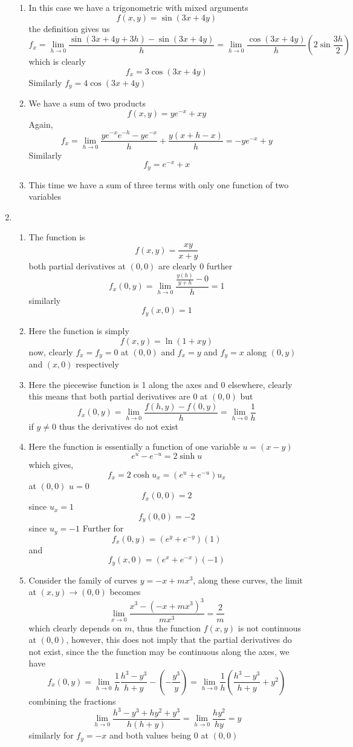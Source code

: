 \documentclass[12pt]{article}
\begin{document}
\begin{enumerate}
\begin{enumerate}
\item
In this case we have a trigonometric with mixed arguments
$$
f(x,y) = \sin(3x + 4y)
$$
the definition gives us
$$
f_{x} = \lim_{ h \to 0 } \frac{\sin(3x + 4y + 3h)-\sin(3x + 4y)}{h} = \lim_{ h \to 0 } \frac{\cos(3x + 4y)}{h} \left( 2\sin \frac{3h}{2} \right)
$$
which is clearly
$$
f_{x} = 3\cos(3x + 4y)
$$
Similarly $f_{y} = 4\cos(3x + 4y)$

\item
We have a sum of two products
$$
f(x,y) = ye^{ -x } + xy
$$
Again, 
$$
f_{x} = \lim_{ h \to 0 }\frac{ ye^{ -x }e^{ -h }-ye^{ -x }}{h} + \frac{y(x+h-x)}{h} = -ye^{ -x }+ y
$$
Similarly
$$
f_{y} = e^{ -x } + x
$$

\item
This time we have a sum of three terms with only one function of two variables


\end{enumerate}

\item
\begin{enumerate}
\item
The function is
$$
f(x,y) = \frac{xy}{x + y}
$$
both partial derivatives at $(0,0)$ are clearly $0$ further
$$
f_{x}(0,y) = \lim_{ h \to 0 } \frac{\frac{y(h)}{y + h}-0}{h} = 1
$$
similarly
$$
f_{y}(x,0) = 1
$$
\item
Here the function is simply
$$
f(x,y) = \ln(1 +xy)
$$
now, clearly $f_{x} = f_{y} = 0$ at $(0,0)$ and $f_{x} = y$ and $f_{y}=x$ along $(0,y)$ and $(x,0)$ respectively

\item
Here the piecewise function is 1 along the axes and 0 elsewhere, clearly this means that both partial derivatives are 0 at $(0,0)$ but 
$$
f_{x}(0,y) = \lim_{ h \to 0 } \frac{f(h,y)-f(0,y)}{h} = \lim_{ h \to 0 } \frac{1}{h}
$$
if $y \neq 0$ thus the derivatives do not exist

\item
Here the function is essentially a function of one variable $u = (x-y)$
$$
e^{ u } - e^{ -u }= 2\sinh u
$$
which gives, 
$$
f_{x} = 2\cosh u_{x} = (e^{ u } + e^{ -u })u_{x}
$$
at $(0,0)$ $u=0$ 
$$
f_{x}(0,0) = 2
$$
since $u_{x}=1$ 
$$
f_{y}(0,0) = -2
$$
since $u_{y}=-1$
Further for
$$
f_{x}(0,y) = (e^{ y } + e^{ -y })(1)
$$
and 
$$
f_{y}(x,0) = (e^{ x } + e^{ -x })(-1)
$$
\item
Consider the family of curves $y = -x + mx^{3}$, along these curves, the limit at $(x,y) \to (0,0)$ becomes
$$
\lim_{ x \to 0 } \frac{x^{3}-(-x + mx^{3})^{3}}{mx^{3}} = \frac{2}{m}
$$
which clearly depends on $m$, thus the function $f(x,y)$ is not continuous at $(0,0)$, however, this does not imply that the partial derivatives do not exist, since the the function may be continuous along the axes, we have
$$
f_{x}(0,y) = \lim_{ h \to 0 } \frac{1}{h}\frac{h^{3} - y^{3}}{h + y} - \left( -\frac{y^{3}}{y} \right) = \lim_{ h \to 0 } \frac{1}{h}\left( \frac{h^{3}-y^{3}}{h + y} + y^{2}  \right)
$$
combining the fractions
$$
\lim_{ h \to 0 } \frac{h^{3}-y^{3} +hy^{2} + y^{3}}{h(h + y)} = \lim_{ h \to 0 } \frac{hy^{2}}{hy} = y
$$
similarly for $f_{y} = -x$ and both values being $0$ at $(0,0)$
\end{enumerate}


\end{enumerate}
\end{document}
